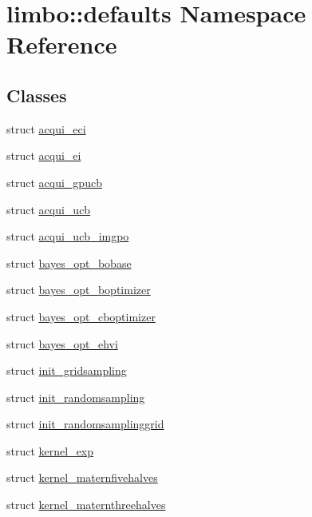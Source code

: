 \hypertarget{namespacelimbo_1_1defaults}{}\section{limbo\+:\+:defaults Namespace Reference}
\label{namespacelimbo_1_1defaults}
\subsection*{Classes}
\begin{DoxyCompactItemize}
\item 
struct \hyperlink{structlimbo_1_1defaults_1_1acqui__eci}{acqui\+\_\+eci}
\item 
struct \hyperlink{structlimbo_1_1defaults_1_1acqui__ei}{acqui\+\_\+ei}
\item 
struct \hyperlink{structlimbo_1_1defaults_1_1acqui__gpucb}{acqui\+\_\+gpucb}
\item 
struct \hyperlink{structlimbo_1_1defaults_1_1acqui__ucb}{acqui\+\_\+ucb}
\item 
struct \hyperlink{structlimbo_1_1defaults_1_1acqui__ucb__imgpo}{acqui\+\_\+ucb\+\_\+imgpo}
\item 
struct \hyperlink{structlimbo_1_1defaults_1_1bayes__opt__bobase}{bayes\+\_\+opt\+\_\+bobase}
\item 
struct \hyperlink{structlimbo_1_1defaults_1_1bayes__opt__boptimizer}{bayes\+\_\+opt\+\_\+boptimizer}
\item 
struct \hyperlink{structlimbo_1_1defaults_1_1bayes__opt__cboptimizer}{bayes\+\_\+opt\+\_\+cboptimizer}
\item 
struct \hyperlink{structlimbo_1_1defaults_1_1bayes__opt__ehvi}{bayes\+\_\+opt\+\_\+ehvi}
\item 
struct \hyperlink{structlimbo_1_1defaults_1_1init__gridsampling}{init\+\_\+gridsampling}
\item 
struct \hyperlink{structlimbo_1_1defaults_1_1init__randomsampling}{init\+\_\+randomsampling}
\item 
struct \hyperlink{structlimbo_1_1defaults_1_1init__randomsamplinggrid}{init\+\_\+randomsamplinggrid}
\item 
struct \hyperlink{structlimbo_1_1defaults_1_1kernel__exp}{kernel\+\_\+exp}
\item 
struct \hyperlink{structlimbo_1_1defaults_1_1kernel__maternfivehalves}{kernel\+\_\+maternfivehalves}
\item 
struct \hyperlink{structlimbo_1_1defaults_1_1kernel__maternthreehalves}{kernel\+\_\+maternthreehalves}

\end{DoxyCompactItemize}
